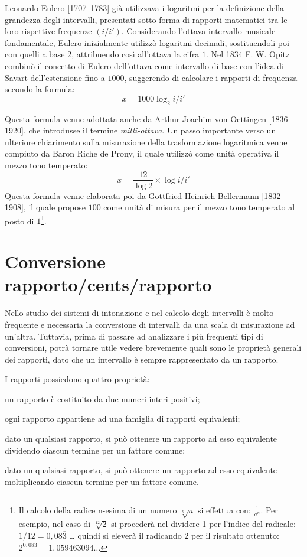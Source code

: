 Leonardo Eulero [1707--1783] già utilizzava i logaritmi per la definizione della
grandezza degli intervalli, presentati sotto forma di rapporti matematici tra le
loro rispettive frequenze $(i/i')$. Considerando l'ottava intervallo musicale
fondamentale, Eulero inizialmente utilizzò logaritmi decimali, sostituendoli poi
con quelli a base 2, attribuendo così all'ottava la cifra $1$. Nel 1834 F. W.
Opitz combinò il concetto di Eulero dell'ottava come intervallo di base con
l'idea di Savart dell'estensione fino a $1000$, suggerendo di calcolare i
rapporti di frequenza secondo la formula:
\[
  x = 1000 \log_2 i/i'
\]

Questa formula venne adottata anche da Arthur Joachim von Oettingen
[1836--1920], che introdusse il termine \emph{milli-ottava}. Un passo importante
verso un ulteriore chiarimento sulla misurazione della trasformazione
logaritmica venne compiuto da Baron Riche de Prony, il quale utilizzò come unità
operativa il mezzo tono temperato:
\[
  x = \frac{12}{\log 2} \times \log i/i'
\]
Questa formula venne elaborata poi da Gottfried Heinrich Bellermann
[1832--1908], il quale propose $100$ come unità di misura per il mezzo tono
temperato al posto di $1$\footnote{Il calcolo della radice n-esima di un numero 
$\sqrt[n]{a}$ si effettua con: $\frac{1}{a^n}$. Per esempio, nel caso di $\sqrt[12]{2}$
si procederà nel dividere 1 per l'indice del radicale: $1/12 = 0{,}08\overline{3 }$ \ldots
quindi si eleverà il radicando 2 per il risultato ottenuto: $2^{0{,}08\overline{3}} = 1{,}059463094\ldots$}.

\section{Conversione rapporto/cents/rapporto}

Nello studio dei sistemi di intonazione e nel calcolo degli intervalli è molto
frequente e necessaria la conversione di intervalli da una scala di misurazione
ad un'altra. Tuttavia, prima di passare ad analizzare i più frequenti tipi di
conversioni, potrà tornare utile vedere brevemente quali sono le proprietà
generali dei rapporti, dato che un intervallo è sempre rappresentato da un
rapporto.

I rapporti possiedono quattro proprietà:
\begin{elenco}
  \item un rapporto è costituito da due numeri interi positivi;
  \item ogni rapporto appartiene ad una famiglia di rapporti equivalenti;
  \item dato un qualsiasi rapporto, si può ottenere un rapporto ad esso
        equivalente dividendo ciascun termine per un fattore comune;
  \item dato un qualsiasi rapporto, si può ottenere un rapporto ad esso
        equivalente moltiplicando ciascun termine per un fattore comune.
\end{elenco}

